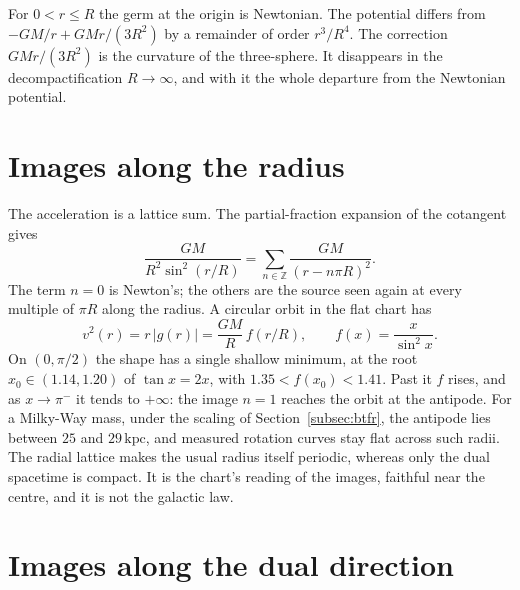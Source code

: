 \documentclass[a4paper]{article}
\begin{document}
For $0<r\le R$ the germ at the origin is Newtonian. The potential differs from $-GM/r + GMr/(3R^2)$ by a remainder of order $r^3/R^4$. The correction $GMr/(3R^2)$ is the curvature of the three-sphere. It disappears in the decompactification $R\to\infty$, and with it the whole departure from the Newtonian potential.

\section{Images along the radius}
\label{sec:radial}

The acceleration is a lattice sum. The partial-fraction expansion of the cotangent gives
\[
\frac{GM}{R^2\sin^2(r/R)}=\sum_{n\in\mathbb{Z}}\frac{GM}{(r-n\pi R)^2}.
\]
The term $n=0$ is Newton's; the others are the source seen again at every multiple of $\pi R$ along the radius. A circular orbit in the flat chart has
\begin{equation}
\label{eq:s3-circular}
v^2(r) = r\,|g(r)| = \frac{GM}{R}\,f(r/R), \qquad f(x)=\frac{x}{\sin^2 x}.
\end{equation}
On $(0,\pi/2)$ the shape has a single shallow minimum, at the root $x_0\in(1.14,1.20)$ of $\tan x=2x$, with $1.35<f(x_0)<1.41$. Past it $f$ rises, and as $x\to\pi^-$ it tends to $+\infty$: the image $n=1$ reaches the orbit at the antipode. For a Milky-Way mass, under the scaling of Section~\ref{subsec:btfr}, the antipode lies between $25$ and $29\,\mathrm{kpc}$, and measured rotation curves stay flat across such radii. The radial lattice makes the usual radius itself periodic, whereas only the dual spacetime is compact. It is the chart's reading of the images, faithful near the centre, and it is not the galactic law.

\section{Images along the dual direction}
\label{sec:dual}
\end{document}
